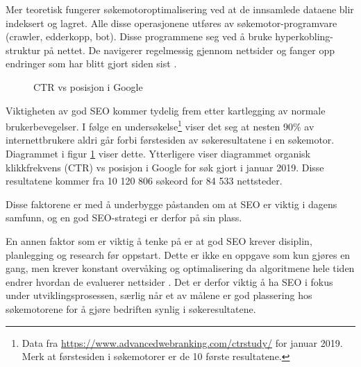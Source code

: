 Mer teoretisk fungerer søkemotoroptimalisering ved at de innsamlede dataene blir indeksert og lagret. Alle disse operasjonene utføres av søkemotor-programvare (crawler, edderkopp,
bot). Disse programmene  seg ved å bruke hyperkobling-struktur på nettet. De navigerer regelmessig gjennom nettsider og fanger opp endringer som har blitt gjort siden sist  \cite[s.~488]{yalccin2010search}.

\begin{figure}[H]
    \centering
    \caption{CTR vs posisjon i Google}
    \label{fig:analysis-awr-google-ctr}
\end{figure}

Viktigheten av god SEO kommer tydelig frem etter kartlegging av normale brukerbevegelser. I følge en undersøkelse\footnote{Data fra \url{https://www.advancedwebranking.com/ctrstudy/} for januar 2019. Merk at førstesiden i søkemotorer er de 10 første resultatene.} viser det seg at nesten 90\% av internettbrukere aldri går forbi førstesiden av søkeresultatene i en søkemotor. Diagrammet i figur \ref{fig:analysis-awr-google-ctr} viser dette. Ytterligere viser diagrammet organisk klikkfrekvens (CTR) vs posisjon i Google for søk gjort i januar 2019. Disse resultatene kommer fra 10 120 806 søkeord for 84 533 nettsteder.

Disse faktorene er med å underbygge påstanden om at SEO er viktig i dagens samfunn, og en god SEO-strategi er derfor på sin plass. 

En annen faktor som er viktig å tenke på er at god SEO krever disiplin, planlegging og research før oppstart. Dette er ikke en oppgave som kun gjøres en gang, men krever konstant overvåking og optimalisering da algoritmene hele tiden endrer hvordan de evaluerer nettsider \cite[s.~1]{mitchell2012usb}. Det er derfor viktig å ha SEO i fokus under utviklingsprosessen, særlig når et av målene er god plassering hos søkemotorene for å gjøre bedriften synlig i søkeresultatene.

